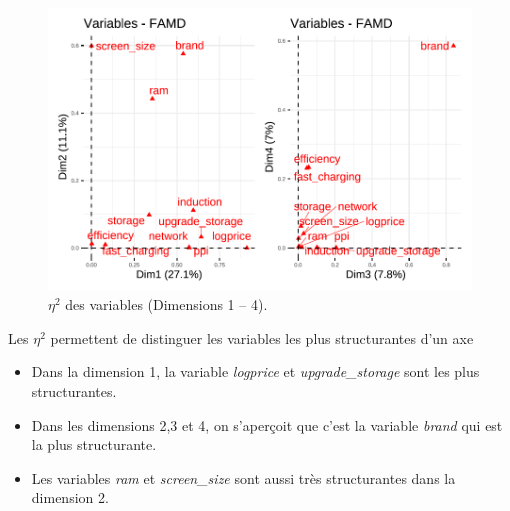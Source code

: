 \documentclass[
  12pt,
]{report}
\begin{document}
\begin{figure}[H]

{\centering \includegraphics{report_files/figure-pdf/unnamed-chunk-16-1.pdf}

}

\caption{\(\eta^2\) des variables (Dimensions 1 -- 4).}

\end{figure}%

Les \(\eta^2\) permettent de distinguer les variables les plus
structurantes d'un axe

\begin{itemize}
\item
  Dans la dimension 1, la variable \emph{logprice} et
  \emph{upgrade\_storage} sont les plus structurantes.
\item
  Dans les dimensions 2,3 et 4, on s'aperçoit que c'est la variable
  \emph{brand} qui est la plus structurante.
\item
  Les variables \emph{ram} et \emph{screen\_size} sont aussi très
  structurantes dans la dimension 2.
\end{itemize}
\end{document}
